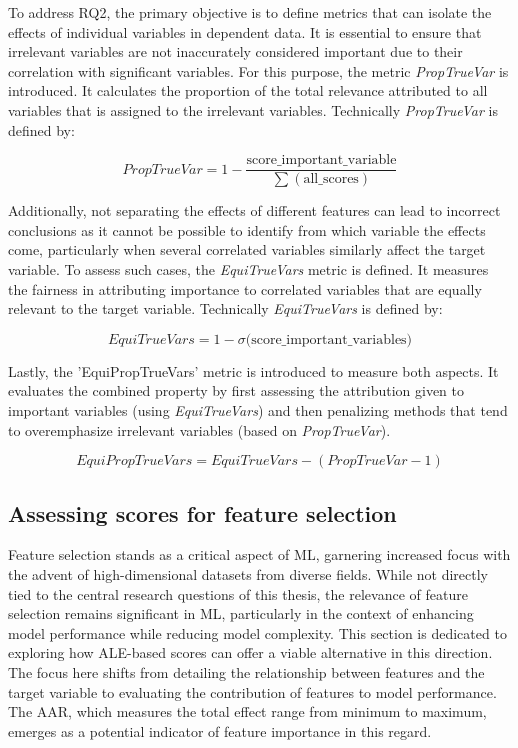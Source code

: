 To address RQ2, the primary objective is to define metrics that can isolate the effects of individual variables in dependent data. It is essential to ensure that irrelevant variables are not inaccurately considered important due to their correlation with significant variables. For this purpose, the metric \textit{PropTrueVar} is introduced. It calculates the proportion of the total relevance attributed to all variables that is assigned to the irrelevant variables. Technically \textit{PropTrueVar} is defined by:


\begin{equation}
\label{eq:lm+inter}
PropTrueVar = 1 - \frac{\text{score\_important\_variable}}{\sum(\text{all\_scores})}
\end{equation}


Additionally, not separating the effects of different features can lead to incorrect conclusions as it cannot be possible to identify from which variable the effects come, particularly when several correlated variables similarly affect the target variable. To assess such cases, the \textit{EquiTrueVars} metric is defined. It measures the fairness in attributing importance to correlated variables that are equally relevant to the target variable. Technically \textit{EquiTrueVars} is defined by:

\begin{equation}
\label{eq:lm+inter}
EquiTrueVars = 1 - \sigma(\text{score\_important\_variables)}
\end{equation}


Lastly, the 'EquiPropTrueVars' metric is introduced to measure both aspects. It evaluates the combined property by first assessing the attribution given to important variables (using \textit{EquiTrueVars}) and then penalizing methods that tend to overemphasize irrelevant variables (based on \textit{PropTrueVar}).

\begin{equation}
\label{eq:lm+inter}
EquiPropTrueVars = EquiTrueVars - (PropTrueVar -1)
\end{equation}


\subsection{Assessing scores for feature selection}

Feature selection stands as a critical aspect of ML, garnering increased focus with the advent of high-dimensional datasets from diverse fields. While not directly tied to the central research questions of this thesis, the relevance of feature selection remains significant in ML, particularly in the context of enhancing model performance while reducing model complexity. This section is dedicated to exploring how ALE-based scores can offer a viable alternative in this direction. The focus here shifts from detailing the relationship between features and the target variable to evaluating the contribution of features to model performance. The AAR, which measures the total effect range from minimum to maximum, emerges as a potential indicator of feature importance in this regard.


